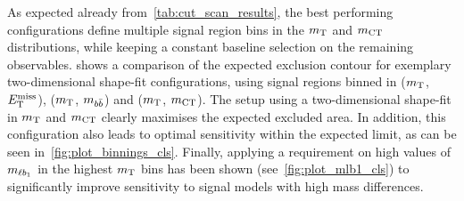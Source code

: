 As expected already from~\cref{tab:cut_scan_results}, the best performing configurations define multiple signal region bins in the $m_{\textrm{T}}$ and $m_{\textrm{CT}}$ distributions, while keeping a constant baseline selection on the remaining observables.  shows a comparison of the expected exclusion contour for exemplary two-dimensional shape-fit configurations, using signal regions binned in ($m_{\textrm{T}}$, $E_{\textrm{T}}^{\textrm{miss}}$), ($m_{\textrm{T}}$, $m_{b\bar{b}}$) and ($m_{\textrm{T}}$, $m_{\textrm{CT}}$). The setup using a two-dimensional shape-fit in $m_{\textrm{T}}$ and $m_{\textrm{CT}}$ clearly maximises the expected excluded area. In addition, this configuration also leads to optimal sensitivity within the expected limit, as can be seen in~\cref{fig:plot_binnings_cls}. Finally, applying a requirement on high values of $m_{\ell b_{1}}$ in the highest $m_{\textrm{T}}$ bins has been shown (see~\cref{fig:plot_mlb1_cls}) to significantly improve sensitivity to signal models with high mass differences. 

